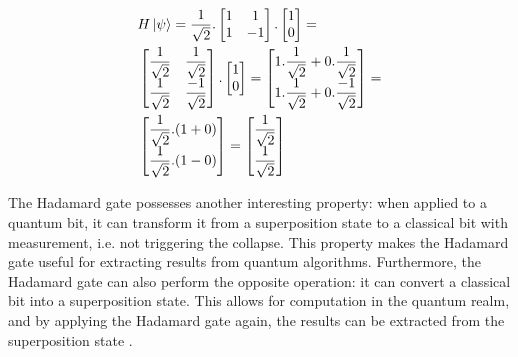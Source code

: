 			\begin{equation}
				\label{eq:hadamardApplyedNum}
				\begin{aligned}
					&H\ket{\psi} = \dfrac{1}{\sqrt{2}}.\begin{bmatrix}
						1& 1 \\
						1& -1
					\end{bmatrix} . \begin{bmatrix}
						1 \\
						0
					\end{bmatrix} = \\
					&\begin{bmatrix}
						\dfrac{1}{\sqrt{2}} &\dfrac{1}{\sqrt{2}} \\
						\dfrac{1}{\sqrt{2}} &\dfrac{-1}{\sqrt{2}}
					\end{bmatrix} .
					\begin{bmatrix}
						1 \\
						0
					\end{bmatrix} = 
					\begin{bmatrix}
						1 . \dfrac{1}{\sqrt{2}} + 0.\dfrac{1}{\sqrt{2}} \\
						1 . \dfrac{1}{\sqrt{2}} + 0.\dfrac{-1}{\sqrt{2}}
					\end{bmatrix} = \\
					&\begin{bmatrix}
						\dfrac{1}{\sqrt{2}} . (1 + 0) \\
						\dfrac{1}{\sqrt{2}} . (1 - 0)
					\end{bmatrix} = 
					\begin{bmatrix}
						\dfrac{1}{\sqrt{2}} \\
						\dfrac{1}{\sqrt{2}}
					\end{bmatrix}
				\end{aligned}
			\end{equation}
			
			\par The Hadamard gate possesses another interesting property: when applied to a quantum bit, it can transform it from a superposition state to a classical bit with measurement, i.e. not triggering the collapse. This property makes the Hadamard gate useful for extracting results from quantum algorithms. Furthermore, the Hadamard gate can also perform the opposite operation: it can convert a classical bit into a superposition state. This allows for computation in the quantum realm, and by applying the Hadamard gate again, the results can be extracted from the superposition state \cite{qcfcs}.\newline


